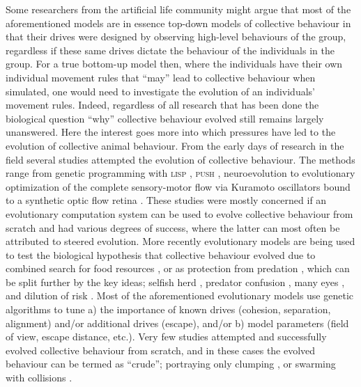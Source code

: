 Some researchers from the artificial life community might argue that most of the aforementioned models are in essence top-down models of collective behaviour in that their drives were designed by observing high-level behaviours of the group, regardless if these same drives dictate the behaviour of the individuals in the group. For a true bottom-up model then, where the individuals have their own individual movement rules that ``may'' lead to collective behaviour when simulated, one would need to investigate the evolution of an individuals' movement rules. Indeed, regardless of all research that has been done the biological question ``why'' collective behaviour evolved still remains largely unanswered. Here the interest goes more into which pressures have led to the evolution of collective animal behaviour. From the early days of research in the field several studies attempted the evolution of collective behaviour. The methods range from genetic programming with \textsc{lisp} \cite{reynolds1993evolved}, \textsc{push} \cite{spector2005emergence}, neuroevolution \cite{kwasnicka2011flocking,ward2001evolving,zaera1996not} to evolutionary optimization of the complete sensory-motor flow via Kuramoto oscillators bound to a synthetic optic flow retina \cite{pino2015modeling}. These studies were mostly concerned if an evolutionary computation system can be used to evolve collective behaviour from scratch and had various degrees of success, where the latter can most often be attributed to steered evolution. More recently evolutionary models are being used to test the biological hypothesis that collective behaviour evolved due to combined search for food resources \cite{witkowski2016emergence}, or as protection from predation \cite{oboshi2003collective}, which can be split further by the key ideas; selfish herd \cite{hamilton1971geometry,morrell2015consequences,olson2013critical,olson2016evolution,reluga2005simulated,wood2007evolving}, predator confusion \cite{chen2014minimal,kunz2006prey,nishimura1997emergence,olson2013predator,zheng2005behavior}, many eyes \cite{ruxton2008application,olson2015exploring}, and dilution of risk \cite{tosh2011conditions}. Most of the aforementioned evolutionary models use genetic algorithms to tune a) the importance of known drives (cohesion, separation, alignment) and/or additional drives (\eg escape), and/or b) model parameters (field of view, escape distance, etc.). Very few studies attempted and successfully evolved collective behaviour from scratch, and in these cases the evolved behaviour can be termed as ``crude''; portraying only clumping \cite{biswas2014causes,witkowski2016emergence}, or swarming with collisions \cite{olson2013critical,olson2013predator,olson2016evolution,witkowski2016emergence}.

